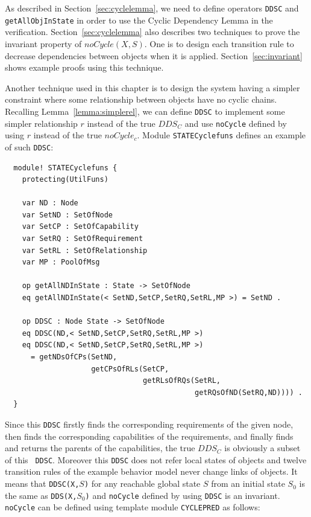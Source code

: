 \documentclass[12pt]{report}
\newcommand{\stt}[1]{{\small{\tt {#1}}}}
\begin{document}
As described in Section~\ref{sec:cyclelemma}, we need to define
operators {\tt DDSC} and {\tt getAllObjInState} in order to use the
Cyclic Dependency Lemma in the
verification. Section~\ref{sec:cyclelemma} also describes two
techniques to prove the invariant property of $noCycle(X,S)$. One is
to design each transition rule to decrease dependencies between
objects when it is applied. Section~\ref{sec:invariant} shows example
proofs using this technique.

Another technique used in this chapter is to design the system having
a simpler constraint where some relationship between objects have no
cyclic chains. Recalling Lemma~\ref{lemma:simplerel}, we can define
{\tt DDSC} to implement some simpler relationship $r$ instead of the
true $DDS\!_C$ and use {\tt noCycle} defined by using $r$ instead of the true
$noCycle_c$. Module {\tt STATECyclefuns} defines an example of such
{\tt DDSC}:
\small
\begin{verbatim}
  module! STATECyclefuns {
    protecting(UtilFuns)
  
    var ND : Node
    var SetND : SetOfNode
    var SetCP : SetOfCapability
    var SetRQ : SetOfRequirement
    var SetRL : SetOfRelationship
    var MP : PoolOfMsg
  
    op getAllNDInState : State -> SetOfNode
    eq getAllNDInState(< SetND,SetCP,SetRQ,SetRL,MP >) = SetND .
  
    op DDSC : Node State -> SetOfNode
    eq DDSC(ND,< SetND,SetCP,SetRQ,SetRL,MP >)
    eq DDSC(ND,< SetND,SetCP,SetRQ,SetRL,MP >)
      = getNDsOfCPs(SetND,
                    getCPsOfRLs(SetCP,
                                getRLsOfRQs(SetRL,
                                            getRQsOfND(SetRQ,ND)))) .
  }
\end{verbatim}
\normalsize
Since this {\tt DDSC} firstly finds the corresponding requirements of
the given node, then finds the corresponding capabilities of the
requirements, and finally finds and returns the parents of the
capabilities, the true $DDS\!_C$ is obviously a subset of this {\tt
  DDSC}.  Moreover this {\tt DDSC} does not refer local states of
objects and twelve transition rules of the example behavior model
never change links of objects. It means that \stt{DDSC(X,$S$)} for any
reachable global state $S$ from an initial state $S\!_0$ is the same as
\stt{DDS(X,$S\!_0$)} and {\tt noCycle} defined by using {\tt DDSC} is an
invariant. {\tt noCycle} can be defined using template module {\tt CYCLEPRED}
as follows:
\end{document}
